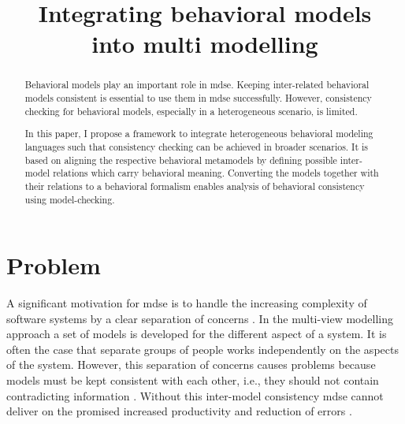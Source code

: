 \documentclass[conference]{IEEEtran}
\begin{document}
\title{Integrating behavioral models\\ into multi modelling}

\author{
}


\maketitle

\begin{abstract}
Behavioral models play an important role in \gls{mdse}.
Keeping inter-related behavioral models consistent is essential to use them in \gls{mdse} successfully. 
However, consistency checking for behavioral models, especially in a heterogeneous scenario, is limited.

In this paper, I propose a framework to integrate heterogeneous behavioral modeling languages such that consistency checking can be achieved in broader scenarios.
It is based on aligning the respective behavioral metamodels by defining possible inter-model relations which carry behavioral meaning.
Converting the models together with their relations to a behavioral formalism enables analysis of behavioral consistency using model-checking. 
\end{abstract}


\IEEEpeerreviewmaketitle



\section{Problem}
A significant motivation for \gls{mdse} is to handle the increasing complexity of software systems by a clear separation of concerns \cite{franceModeldrivenDevelopmentComplex2007}.
In the multi-view modelling approach a set of models is developed for the different aspect of a system.
It is often the case that separate groups of people works independently on the aspects of the system.
However, this separation of concerns causes problems because models must be kept consistent with each other, i.e., they should not contain contradicting information \cite{cicchettiMultiviewApproachesSoftware2019}.
Without this inter-model consistency \gls{mdse} cannot deliver on the promised increased productivity and reduction of errors \cite{brambillaModeldrivenSoftwareEngineering2017}.
\end{document}
